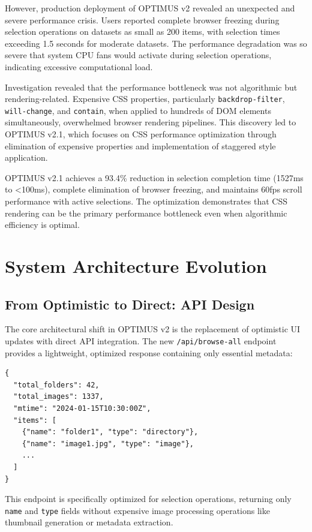\documentclass[10pt]{article}
\begin{document}
However, production deployment of OPTIMUS v2 revealed an unexpected and severe performance crisis. Users reported complete browser freezing during selection operations on datasets as small as 200 items, with selection times exceeding 1.5 seconds for moderate datasets. The performance degradation was so severe that system CPU fans would activate during selection operations, indicating excessive computational load.

Investigation revealed that the performance bottleneck was not algorithmic but rendering-related. Expensive CSS properties, particularly \texttt{backdrop-filter}, \texttt{will-change}, and \texttt{contain}, when applied to hundreds of DOM elements simultaneously, overwhelmed browser rendering pipelines. This discovery led to OPTIMUS v2.1, which focuses on CSS performance optimization through elimination of expensive properties and implementation of staggered style application.

OPTIMUS v2.1 achieves a 93.4\% reduction in selection completion time (1527ms to <100ms), complete elimination of browser freezing, and maintains 60fps scroll performance with active selections. The optimization demonstrates that CSS rendering can be the primary performance bottleneck even when algorithmic efficiency is optimal.

\section{System Architecture Evolution}

\subsection{From Optimistic to Direct: API Design}

The core architectural shift in OPTIMUS v2 is the replacement of optimistic UI updates with direct API integration. The new \texttt{/api/browse-all} endpoint provides a lightweight, optimized response containing only essential metadata:

\begin{lstlisting}[caption={Browse-All API Response Structure}]
{
  "total_folders": 42,
  "total_images": 1337,
  "mtime": "2024-01-15T10:30:00Z",
  "items": [
    {"name": "folder1", "type": "directory"},
    {"name": "image1.jpg", "type": "image"},
    ...
  ]
}
\end{lstlisting}

This endpoint is specifically optimized for selection operations, returning only \texttt{name} and \texttt{type} fields without expensive image processing operations like thumbnail generation or metadata extraction.
\end{document}
